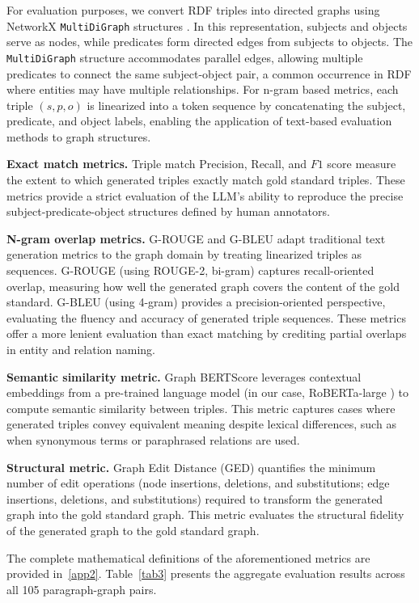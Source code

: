 \documentclass[preprint,12pt]{elsarticle}
\begin{document}
For evaluation purposes, we convert RDF triples into directed graphs using NetworkX \texttt{MultiDiGraph} structures \citep{osti_960616}. In this representation, subjects and objects serve as nodes, while predicates form directed edges from subjects to objects. The \texttt{MultiDiGraph} structure accommodates parallel edges, allowing multiple predicates to connect the same subject-object pair, a common occurrence in RDF where entities may have multiple relationships. For n-gram based metrics, each triple $(s, p, o)$ is linearized into a token sequence by concatenating the subject, predicate, and object labels, enabling the application of text-based evaluation methods to graph structures.

\textbf{Exact match metrics.} Triple match Precision, Recall, and $F1$ score measure the extent to which generated triples exactly match gold standard triples. These metrics provide a strict evaluation of the LLM's ability to reproduce the precise subject-predicate-object structures defined by human annotators.

\textbf{N-gram overlap metrics.} G-ROUGE and G-BLEU adapt traditional text generation metrics to the graph domain by treating linearized triples as sequences. G-ROUGE (using ROUGE-2, bi-gram) captures recall-oriented overlap, measuring how well the generated graph covers the content of the gold standard. G-BLEU (using 4-gram) provides a precision-oriented perspective, evaluating the fluency and accuracy of generated triple sequences. These metrics offer a more lenient evaluation than exact matching by crediting partial overlaps in entity and relation naming.

\textbf{Semantic similarity metric.} Graph BERTScore leverages contextual embeddings from a pre-trained language model (in our case, RoBERTa-large \citep{liu2019robertarobustlyoptimizedbert}) to compute semantic similarity between triples. This metric captures cases where generated triples convey equivalent meaning despite lexical differences, such as when synonymous terms or paraphrased relations are used.

\textbf{Structural metric.} Graph Edit Distance (GED) quantifies the minimum number of edit operations (node insertions, deletions, and substitutions; edge insertions, deletions, and substitutions) required to transform the generated graph into the gold standard graph. This metric evaluates the structural fidelity of the generated graph to the gold standard graph.

The complete mathematical definitions of the aforementioned metrics are provided in~\ref{app2}. Table~\ref{tab3} presents the aggregate evaluation results across all 105 paragraph-graph pairs.
\end{document}
